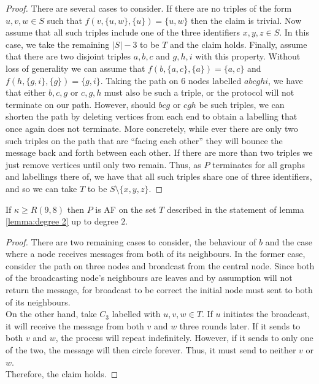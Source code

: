 \begin{proof}
    There are several cases to consider. If there are no triples of the form $u,v,w \in S$ such that $f(v,\{u,w\},\{u\})=\{u,w\}$ then the claim is trivial. Now assume that all such triples include one of the three identifiers $x,y,z \in S$. In this case, we take the remaining $|S|-3$ to be $T$ and the claim holds. Finally, assume that there are two disjoint triples $a,b,c$ and $g,h,i$ with this property. Without loss of generality we can assume that $f(b,\{a,c\},\{a\})=\{a,c\}$ and $f(h,\{g,i\},\{g\})=\{g,i\}$. Taking the path on $6$ nodes labelled $abcghi$, we have that either $b,c,g$ or $c,g,h$ must also be such a triple, or the protocol will not terminate on our path. 
    However, should $bcg$ or $cgh$ be such triples, we can shorten the path by deleting vertices from each end to obtain a labelling that once again does not terminate.
    More concretely, while ever there are only two such triples on the path that are ``facing each other'' they will bounce the message back and forth between each other.
    If there are more than two triples we just remove vertices until only two remain.
    Thus, as $P$ terminates for all graphs and labellings there of, we have that all such triples share one of three identifiers, and so we can take $T$ to be $S\setminus\{x,y,z\}$.
\end{proof}
\begin{corollary}
    If $\kappa\geq R(9,8)$ then $P$ is AF on the set $T$ described in the statement of lemma \ref{lemma:degree 2} up to degree $2$.
\end{corollary}
\begin{proof}
    There are two remaining cases to consider, the behaviour of $b$ and the case where a node receives messages from both of its neighbours.
    In the former case, consider the path on three nodes and broadcast from the central node.
    Since both of the broadcasting node's neighbours are leaves and by assumption will not return the message, for broadcast to be correct the initial node must sent to both of its neighbours.\\
    On the other hand, take $C_3$ labelled with $u,v,w \in T$.
    If $u$ initiates the broadcast, it will receive the message from both $v$ and $w$ three rounds later.
    If it sends to both $v$ and $w$, the process will repeat indefinitely.
    However, if it sends to only one of the two, the message will then circle forever.
    Thus, it must send to neither $v$ or $w$.\\
    Therefore, the claim holds.
\end{proof}
